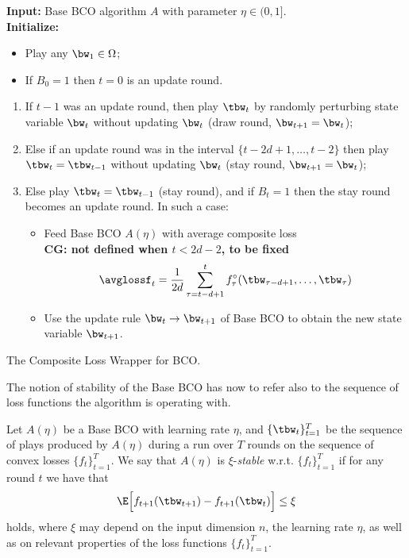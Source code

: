 \begin{algorithm2e}[t]
 
\textbf{Input:} Base BCO algorithm $A$ with parameter $\eta \in (0,1]$.\\%
\textbf{Initialize:}
\begin{itemize}[topsep=0pt,parsep=0pt,itemsep=0pt]
\item Play any $\bw_1 \in \Omega$;
\item If $B_0 = 1$ then $t=0$ is an update round.
\end{itemize}
%
 { {
\begin{enumerate}[topsep=0pt,parsep=0pt,itemsep=0pt]
\item If $t-1$ was an update round, then play $\tbw_t$ by randomly perturbing state variable $\bw_t$ without updating $\bw_t$ (draw round, $\bw_{t+1} = \bw_t$);
\item Else if an update round was in the interval $\{t-2d+1, \dots,t-2\}$ then play $\tbw_t = \tbw_{t-1}$ without updating $\bw_t$
(stay round, $\bw_{t+1} = \bw_t$);
\item Else play $\tbw_t = \tbw_{t-1}$ (stay round), and if $B_t=1$ then the stay round becomes an update round. In such a case:
%
\begin{itemize}[topsep=0pt,parsep=0pt,itemsep=0pt]
\item Feed Base BCO $A(\eta)$ with average composite loss\\
{\bf CG: not defined when $t< 2d-2$, to be fixed}
%
\[
\avglossf_t = \frac{1}{2d}\sum_{\tau=t-d+1}^t \fcomp_\tau(\tbw_{\tau-d+1},\dots,\tbw_{\tau})
\] 
\item Use the update rule $\bw_t\rightarrow \bw_{t+1}$ of Base BCO to obtain the new state variable $\bw_{t+1}$. 
\end{itemize}
\end{enumerate}
} } \caption{The Composite Loss Wrapper for BCO.}
\label{a:delayed-bco}
\end{algorithm2e}
%
The notion of stability of the Base BCO has now to refer also to the sequence of loss functions the algorithm is operating with.
%
\begin{definition}\label{d:stabilitybco}
Let $A(\eta)$ be a Base BCO with learning rate $\eta$, and $\{\tbw_t\}_{t=1}^T$ be the sequence of plays produced by $A(\eta)$ during a run over $T$ rounds on the sequence of convex losses $\{f_t\}_{t=1}^T$. We say that $A(\eta)$ is $\xi$-{\em stable} w.r.t. $\{f_t\}_{t=1}^T$ if for any round $t$ we have that
\[
	\E\Big[f_{t+1}(\tbw_{t+1}) -f_{t+1}(\tbw_t)\Big] \leq \xi
\] 
holds, where $\xi$ may depend on the input dimension $n$, the learning rate $\eta$, as well as on relevant properties of the loss functions $\{f_t\}_{t=1}^T$.
\end{definition}
